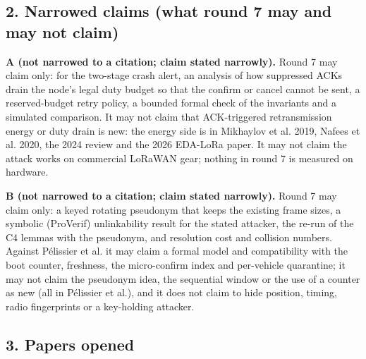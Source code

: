 \subsection*{2. Narrowed claims (what round 7 may and may not claim)}

\textbf{A (not narrowed to a citation; claim stated narrowly).} Round 7 may claim only: for the two-stage crash alert, an analysis of how suppressed ACKs drain the node's legal duty budget so that the confirm or cancel cannot be sent, a reserved-budget retry policy, a bounded formal check of the invariants and a simulated comparison. It may not claim that ACK-triggered retransmission energy or duty drain is new: the energy side is in Mikhaylov et al. 2019, Nafees et al. 2020, the 2024 review and the 2026 EDA-LoRa paper. It may not claim the attack works on commercial LoRaWAN gear; nothing in round 7 is measured on hardware.

\textbf{B (not narrowed to a citation; claim stated narrowly).} Round 7 may claim only: a keyed rotating pseudonym that keeps the existing frame sizes, a symbolic (ProVerif) unlinkability result for the stated attacker, the re-run of the C4 lemmas with the pseudonym, and resolution cost and collision numbers. Against P\'elissier et al. it may claim a formal model and compatibility with the boot counter, freshness, the micro-confirm index and per-vehicle quarantine; it may not claim the pseudonym idea, the sequential window or the use of a counter as new (all in P\'elissier et al.), and it does not claim to hide position, timing, radio fingerprints or a key-holding attacker.

\subsection*{3. Papers opened}

